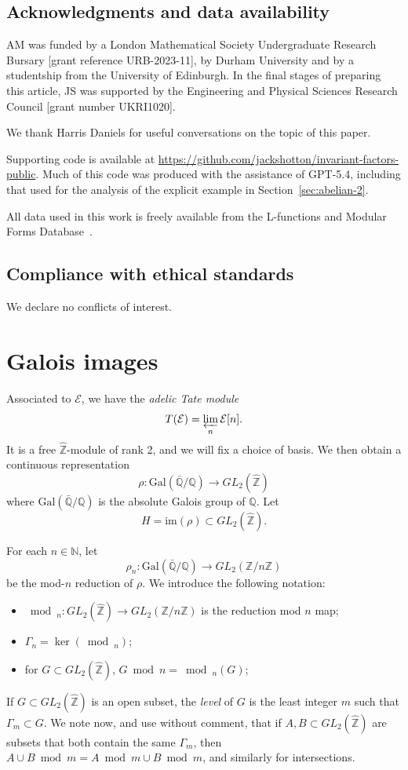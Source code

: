 \documentclass{amsart}
\theoremstyle{plain}
\theoremstyle{remark}
\newcommand{\N}{\mathbb{N}}
\newcommand{\Q}{\mathbb{Q}}
\newcommand{\Z}{\mathbb{Z}}
\newcommand{\Zhat}{\hat{\mathbb{Z}}}
\newcommand{\E}{\mathcal{E}}
\newcommand{\GalQ}{\mathrm{Gal}(\bar{\Q}/\Q)}
\newcommand{\im}{\mathrm{im}}
\begin{document}
\subsection{Acknowledgments and data availability}

AM was funded by a London Mathematical Society Undergraduate Research Bursary [grant reference URB-2023-11], by Durham University and by a studentship from the University of Edinburgh. In the final stages of preparing this article, JS was supported by the Engineering and Physical Sciences Research Council [grant number UKRI1020].

We thank Harris Daniels for useful conversations on the topic of this paper.

Supporting code is available at
\url{https://github.com/jackshotton/invariant-factors-public}. Much of this code was produced with the assistance of GPT-5.4, including that used for the analysis of the explicit example in Section~\ref{sec:abelian-2}. 

All data used in this work is freely available from the L-functions and Modular Forms Database~\cite{lmfdb}.

\subsection{Compliance with ethical standards}

We declare no conflicts of interest.

\section{Galois images}
\label{sec:galois}
Associated to $\E$, we have the \emph{adelic Tate module} 
\[T(\E) = \varprojlim_{n} \E[n].\]
It is a free $\Zhat$-module of rank 2, and we will fix a choice of basis. We then obtain a continuous representation
\[\rho : \GalQ \to GL_2(\Zhat)\]
where $\GalQ$ is the absolute Galois group of $\Q$. Let \[H = \im(\rho) \subset GL_2(\Zhat).\]

For each $n \in \N$, let 
\[\rho_n : \GalQ \to GL_2(\Z/n\Z)\]
be the mod-$n$ reduction of $\rho$. We introduce the following notation: 
\begin{itemize}
    \item $\bmod_n : GL_2(\Zhat) \to GL_2(\Z/n\Z)$ is the reduction mod $n$ map;
    \item $\Gamma_n = \ker(\bmod_n)$;
    \item for $G \subset GL_2(\Zhat)$, $G \bmod n = \bmod_n(G)$; 
\end{itemize}
If $G \subset GL_2(\Zhat)$ is an open subset, the \emph{level} of $G$ is the least integer $m$ such that $\Gamma_m \subset G$. 
We note now, and use without comment, that if $A, B \subset GL_2(\Zhat)$ are subsets that both contain the same $\Gamma_m$, then $A\cup B \bmod m = A\bmod m \cup B \bmod m$, and similarly for intersections.
\end{document}
